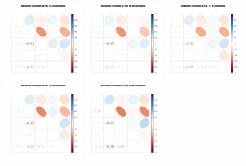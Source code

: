 \clearpage
\begin{figure}[h]
\centering
\includegraphics[width=0.3\textwidth,height=0.2\textheight]{Chapters/05MCMCOU/plots/paraEvolution/corMatrix25.pdf}
\includegraphics[width=0.3\textwidth,height=0.2\textheight]{Chapters/05MCMCOU/plots/paraEvolution/corMatrix26.pdf}
\includegraphics[width=0.3\textwidth,height=0.2\textheight]{Chapters/05MCMCOU/plots/paraEvolution/corMatrix27.pdf}
\includegraphics[width=0.3\textwidth,height=0.2\textheight]{Chapters/05MCMCOU/plots/paraEvolution/corMatrix28.pdf}
\includegraphics[width=0.3\textwidth,height=0.2\textheight]{Chapters/05MCMCOU/plots/paraEvolution/corMatrix29.pdf}

\end{figure}
